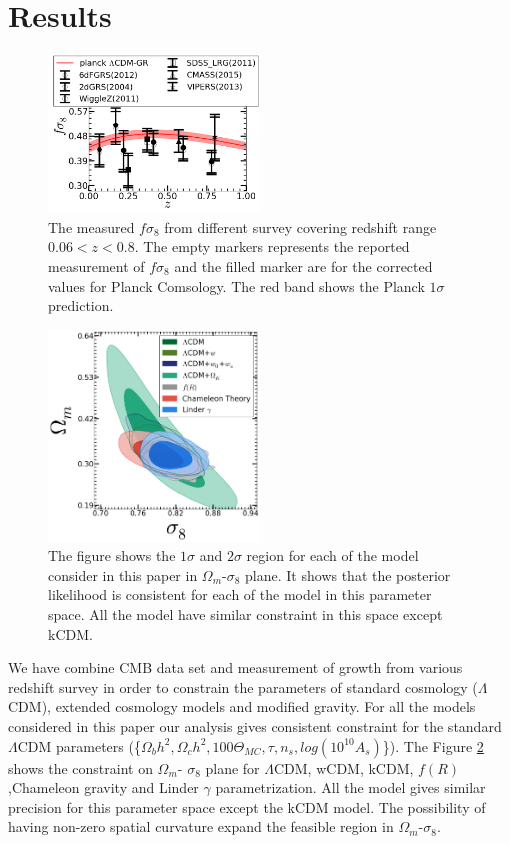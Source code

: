 \section{Results} 
\label{sec:results} 

\begin{figure}
\includegraphics[width=0.5\textwidth]{plots/fs8z_data_bestfit.png}
\caption{The measured $f\sigma_8$ from different survey covering redshift range $0.06<z<0.8$. The empty markers represents the reported measurement of $f\sigma_8$ and the filled marker are for the corrected values for Planck Comsology. The red band shows the Planck $1\sigma$ prediction. }
\label{fig:fs8z}
\end{figure}

\begin{figure}
\includegraphics[width=0.5\textwidth]{plots/Like-2D/All-sigma8-omegam_2D.png}
\caption{The figure shows the $1\sigma$ and $2\sigma$ region for each of the model consider in this paper in $\Omega_m$-$\sigma_8$ plane. It shows that the posterior likelihood is consistent for each of the model in this parameter space. All the model have similar constraint in this space except kCDM.}
\label{fig:Ms8}
\end{figure}


We have combine CMB data set and measurement of growth from various redshift survey in order to constrain the parameters of standard cosmology ($\Lambda$CDM), extended cosmology models  and modified gravity. For all the models considered in this paper our analysis gives consistent constraint for the standard $\Lambda$CDM parameters (\{$\Omega_b h^2, \Omega_c h^2, 100\Theta_{MC} ,\tau, n_s, log(10^{10} A_s) $\}).  The Figure \ref{fig:Ms8} shows the constraint on $\Omega_m$- $\sigma_8$ plane for $\Lambda$CDM, wCDM, kCDM, $f(R)$ ,Chameleon gravity and Linder $\gamma$ parametrization.  All the model gives similar precision for this parameter space except the kCDM model. The possibility of having non-zero spatial curvature expand the feasible region in $\Omega_m$-$\sigma_8$.  

